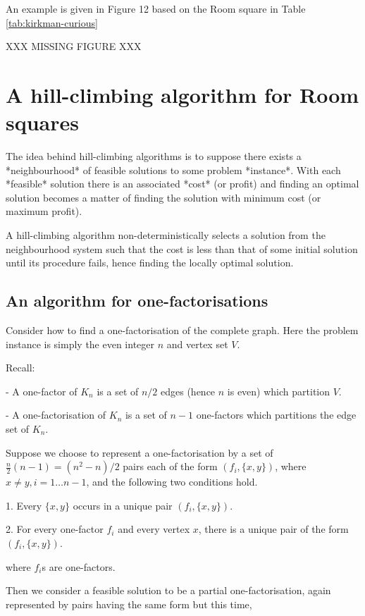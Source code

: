 \documentclass[
  11pt,
  a4paper]{book}\usepackage[]{graphicx}\usepackage[]{xcolor}
\newcounter{example}
\begin{document}
An example is given in Figure 12 based on the Room square
in Table
\ref{tab:kirkman-curious}

XXX MISSING FIGURE XXX

\section{A hill-climbing algorithm for Room squares}

The idea behind hill-climbing algorithms is to suppose
there exists a *neighbourhood* of feasible solutions to
some problem *instance*. With each *feasible* solution
there is an associated *cost* (or profit) and finding
an optimal solution becomes a matter of finding the solution
with minimum cost (or maximum profit).

A hill-climbing algorithm non-deterministically selects a
solution from the neighbourhood system such that the cost
is less than that of some initial solution until its
procedure fails, hence finding the locally optimal solution.

\subsection{An algorithm for one-factorisations}

Consider how to find a one-factorisation of the complete
graph. Here the problem instance is simply the even integer
$n$ and vertex set $V$.

Recall:

  - A one-factor of $K_n$ is a set of $n/2$ edges (hence
  $n$ is even) which partition $V$.

  - A one-factorisation of $K_n$ is a set of $n - 1$ one-factors
    which partitions the edge set of $K_n$.

Suppose we choose to represent a one-factorisation by a set
of $\frac{n}{2}(n - 1) = (n^2 - n)/2$ pairs each of the form
$(f_i, \{x, y\})$, where $x \neq y, i = 1 \ldots n - 1$,
and the following two conditions hold.

  1. Every $\{x, y\}$ occurs in a unique pair
  $(f_i, \{x, y\})$.

  2. For every one-factor $f_i$ and every vertex $x$,
  there is a unique pair of the form $(f_i, \{x, y\})$.

where $f_i$s are one-factors.

Then we consider a feasible solution to be a partial
one-factorisation, again represented by pairs having the
same form but this time,
\end{document}
